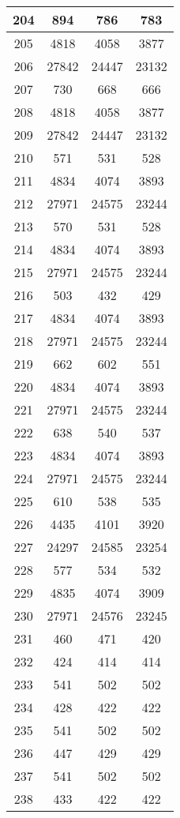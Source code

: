 \begin{table}[H]
\begin{tabular}{|c|c|c|c|}
\hline
204 & 894 & 786 & 783 \\
\hline
205 & 4818 & 4058 & 3877 \\
\hline
206 & 27842 & 24447 & 23132 \\
\hline
207 & 730 & 668 & 666 \\
\hline
208 & 4818 & 4058 & 3877 \\
\hline
209 & 27842 & 24447 & 23132 \\
\hline
210 & 571 & 531 & 528 \\
\hline
211 & 4834 & 4074 & 3893 \\
\hline
212 & 27971 & 24575 & 23244 \\
\hline
213 & 570 & 531 & 528 \\
\hline
214 & 4834 & 4074 & 3893 \\
\hline
215 & 27971 & 24575 & 23244 \\
\hline
216 & 503 & 432 & 429 \\
\hline
217 & 4834 & 4074 & 3893 \\
\hline
218 & 27971 & 24575 & 23244 \\
\hline
219 & 662 & 602 & 551 \\
\hline
220 & 4834 & 4074 & 3893 \\
\hline
221 & 27971 & 24575 & 23244 \\
\hline
222 & 638 & 540 & 537 \\
\hline
223 & 4834 & 4074 & 3893 \\
\hline
224 & 27971 & 24575 & 23244 \\
\hline
225 & 610 & 538 & 535 \\
\hline
226 & 4435 & 4101 & 3920 \\
\hline
227 & 24297 & 24585 & 23254 \\
\hline
228 & 577 & 534 & 532 \\
\hline
229 & 4835 & 4074 & 3909 \\
\hline
230 & 27971 & 24576 & 23245 \\
\hline
231 & 460 & 471 & 420 \\
\hline
232 & 424 & 414 & 414 \\
\hline
233 & 541 & 502 & 502 \\
\hline
234 & 428 & 422 & 422 \\
\hline
235 & 541 & 502 & 502 \\
\hline
236 & 447 & 429 & 429 \\
\hline
237 & 541 & 502 & 502 \\
\hline
238 & 433 & 422 & 422 \\

\end{tabular}
\end{table}
